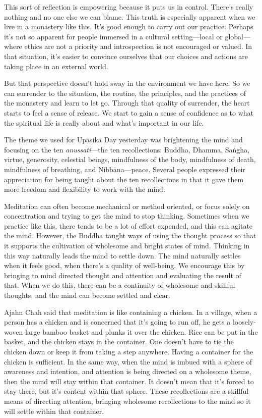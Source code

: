 This sort of reflection is empowering because it puts us in control. 
There's really nothing and no one else we can blame. This truth is 
especially apparent when we live in a monastery like this. It's good 
enough to carry out our practice. Perhaps it's not so apparent for 
people immersed in a cultural setting---local or global---where ethics 
are not a priority and introspection is not encouraged or valued. In 
that situation, it's easier to convince ourselves that our choices and 
actions are taking place in an external world.

But that perspective doesn't hold sway in the environment we have here. 
So we can surrender to the situation, the routine, the principles, and 
the practices of the monastery and learn to let go. Through that 
quality of surrender, the heart starts to feel a sense of release. We 
start to gain a sense of confidence as to what the spiritual life is 
really about and what's important in our life.


The theme we used for Upāsikā Day yesterday was brightening the mind 
and focusing on the ten \emph{anussati}---the ten recollections: 
Buddha, Dhamma, Saṅgha, virtue, generosity, celestial beings, 
mindfulness of the body, mindfulness of death, mindfulness of 
breathing, and Nibbāna---peace. Several people expressed their 
appreciation for being taught about the ten recollections in that it 
gave them more freedom and flexibility to work with the mind.

Meditation can often become mechanical or method oriented, or focus 
solely on concentration and trying to get the mind to stop thinking. 
Sometimes when we practice like this, there tends to be a lot of effort 
expended, and this can agitate the mind. However, the Buddha taught 
ways of using the thought process so that it supports the cultivation 
of wholesome and bright states of mind. Thinking in this way naturally 
leads the mind to settle down. The mind naturally settles when it feels 
good, when there's a quality of well-being. We encourage this by 
bringing to mind directed thought and attention and evaluating the 
result of that. When we do this, there can be a continuity of wholesome 
and skillful thoughts, and the mind can become settled and clear.

Ajahn Chah said that meditation is like containing a chicken. In a 
village, when a person has a chicken and is concerned that it's going 
to run off, he gets a loosely-woven large bamboo basket and plunks it 
over the chicken. Rice can be put in the basket, and the chicken stays 
in the container. One doesn't have to tie the chicken down or keep it 
from taking a step anywhere. Having a container for the chicken is 
sufficient. In the same way, when the mind is imbued with a sphere of 
awareness and intention, and attention is being directed on a wholesome 
theme, then the mind will stay within that container. It doesn't mean 
that it's forced to stay there, but it's content within that sphere. 
These recollections are a skillful means of directing attention, 
bringing wholesome recollections to the mind so it will settle within 
that container.

